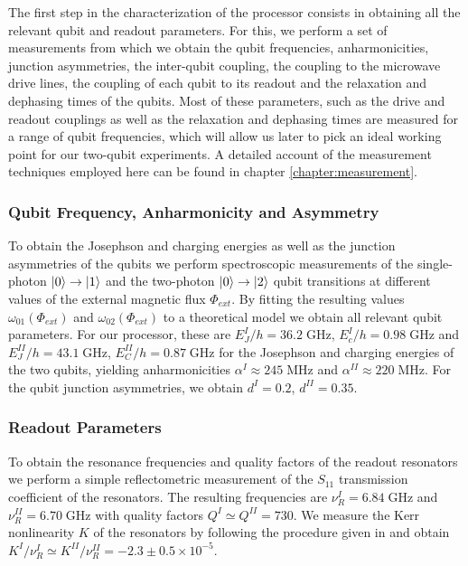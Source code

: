 The first step in the characterization of the processor consists in obtaining all the relevant qubit and readout parameters. For this, we perform a set of measurements from which we obtain the qubit frequencies, anharmonicities, junction asymmetries, the inter-qubit coupling, the coupling to the microwave drive lines, the coupling of each qubit to its readout and the relaxation and dephasing times of the qubits. Most of these parameters, such as the drive and readout couplings as well as the relaxation and dephasing times are measured for a range of qubit frequencies, which will allow us later to pick an ideal working point for our two-qubit experiments. A detailed account of the measurement techniques employed here can be found in chapter \ref{chapter:measurement}. 

\subsubsection{Qubit Frequency, Anharmonicity and Asymmetry}

To obtain the Josephson and charging energies as well as the junction asymmetries of the qubits we perform spectroscopic measurements of the single-photon $\left| 0 \right>\to \left| 1 \right>$ and the two-photon $\left| 0 \right>\to\left| 2 \right>$ qubit transitions at different values of the external magnetic flux $\Phi_{ext}$. By fitting the resulting values $\omega_{01}(\Phi_{ext})$ and $\omega_{02}(\Phi_{ext})$ to a theoretical model we obtain all relevant qubit parameters. For our processor, these are $E_J^I / h = 36.2\; \mathrm{GHz}$, $E_c^I / h = 0.98 \; \mathrm{GHz}$ and $E_J^{II} / h = 43.1\; \mathrm{GHz}$, $E_C^{II} / h = 0.87 \; \mathrm{GHz}$ for the Josephson and charging energies of the two qubits, yielding anharmonicities $\alpha^I\approx 245\;\mathrm{MHz}$ and $\alpha^{II}\approx 220\;\mathrm{MHz}$. For the qubit junction asymmetries, we obtain $d^I = 0.2$, $d^{II} =  0.35$.

\subsubsection{Readout Parameters}

To obtain the resonance frequencies and quality factors of the readout resonators we perform a simple reflectometric measurement of the $S_{11}$ transmission coefficient of the resonators. The resulting frequencies are $\nu_R^I = 6.84 \; \mathrm{GHz}$ and $\nu_R^{II} = 6.70 \; \mathrm{GHz}$ with quality factors $Q^I \simeq Q^{II} = 730$. We measure the Kerr nonlinearity $K$ of the resonators by following the procedure given in \citep[p. 166]{palacios-laloy_superconducting_2010} and obtain $K^I / \nu_R^I \simeq K^{II} / \nu_R^{II} = -2.3\pm 0.5 \times 10^{-5}$.

